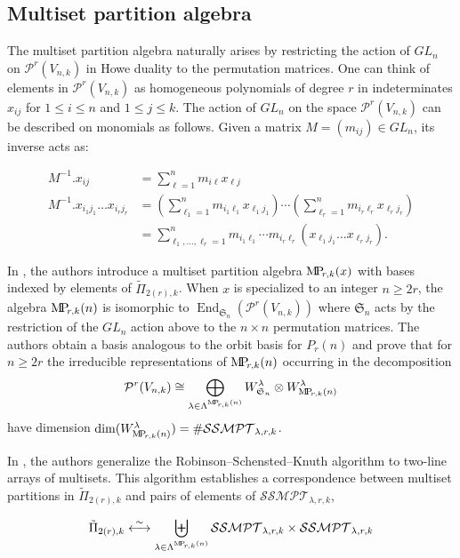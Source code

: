 \documentclass[ALCO,Unicode,published]{cedram}
\newcommand{\PP}{\mathcal{P}}
\newcommand{\SG}{\mathfrak{S}}
\newcommand{\MP}{{\rm M\!P\!}}
\newcommand{\SSMPT}{\mathcal{SSMPT}}
\DeclareMathOperator{\End}{End}
\begin{document}
\subsection{Multiset partition algebra}

The multiset partition algebra naturally arises by restricting the action of $GL_n$ on $\PP^r(V_{n,k})$ in Howe duality to the permutation matrices. One can think of elements in $\PP^r(V_{n,k})$ as homogeneous polynomials of degree $r$ in indeterminates $x_{ij}$ for $1\leq i\leq n$ and $1\leq j\leq k$. The action of $GL_n$ on the space $\PP^r(V_{n,k})$ can be described on monomials as follows. Given a matrix $M=(m_{ij})\in GL_n$, its inverse acts as:

\begin{align}
    M^{-1}.x_{ij}&=\sum_{\ell=1}^n m_{i\ell}x_{\ell j}\nonumber\\
    M^{-1}.x_{i_1j_1}\dots x_{i_rj_r}&=\left(\sum_{\ell_1=1}^n m_{i_1\ell_1}x_{\ell_1 j_1}\right)\cdots\left(\sum_{\ell_r=1}^n m_{i_r\ell_r}x_{\ell_r j_r}\right)\nonumber\\
    &=\sum_{\ell_1,\dots,\ell_r=1}^n m_{i_1\ell_1}\cdots m_{i_r\ell_r} (x_{\ell_1j_1}\dots x_{\ell_rj_r}).\label{eq:Ua_computation}
\end{align}

In \cite{orellana2020howe}, the authors introduce a multiset partition algebra $\MP_{r,k}(x)$ with bases indexed by elements of $\tilde\Pi_{2(r),k}$. When $x$ is specialized to an integer $n\geq 2r$, the algebra $\MP_{r,k}(n)$ is isomorphic to $\End_{\SG_n}(\PP^r(V_{n,k}))$ where $\SG_n$ acts by the restriction of the $GL_n$ action above to the $n\times n$ permutation matrices. The authors obtain a basis analogous to the orbit basis for $P_r(n)$ and prove that for $n\geq 2r$ the irreducible representations of $\MP_{r,k}(n)$ occurring in the decomposition \begin{align}
    \PP^r(V_{n,k})\cong\bigoplus_{\lambda\in\Lambda^{\MP_{r,k}(n)}}W_{\SG_n}^\lambda\otimes W_{\MP_{r,k}(n)}^\lambda \label{eq:mprk_decomp}
\end{align} have dimension $\dim(W_{\MP_{r,k}(n)}^\lambda)=\#\SSMPT_{\lambda,r,k}$.

In \cite{MR4090833}, the authors generalize the Robinson–Schensted–Knuth algorithm to two-line arrays of multisets. This algorithm establishes a correspondence between multiset partitions in $\tilde\Pi_{2(r),k}$ and pairs of elements of $\SSMPT_{\lambda,r,k}$, 

\[\tilde\Pi_{2(r),k}\stackrel{\sim}{\longleftrightarrow}\biguplus_{\lambda\in\Lambda^{\MP_{r,k}(n)}}\SSMPT_{\lambda,r,k}\times \SSMPT_{\lambda,r,k}\]
\end{document}
